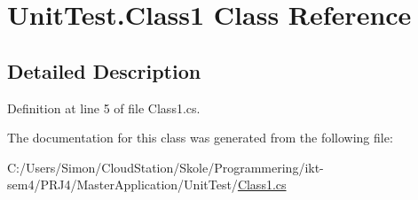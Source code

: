 \hypertarget{class_unit_test_1_1_class1}{}\section{Unit\+Test.\+Class1 Class Reference}
\label{class_unit_test_1_1_class1}


\subsection{Detailed Description}


Definition at line 5 of file Class1.\+cs.



The documentation for this class was generated from the following file\+:\begin{DoxyCompactItemize}
\item 
C\+:/\+Users/\+Simon/\+Cloud\+Station/\+Skole/\+Programmering/ikt-\/sem4/\+P\+R\+J4/\+Master\+Application/\+Unit\+Test/\mbox{\hyperlink{_class1_8cs}{Class1.\+cs}}\end{DoxyCompactItemize}
